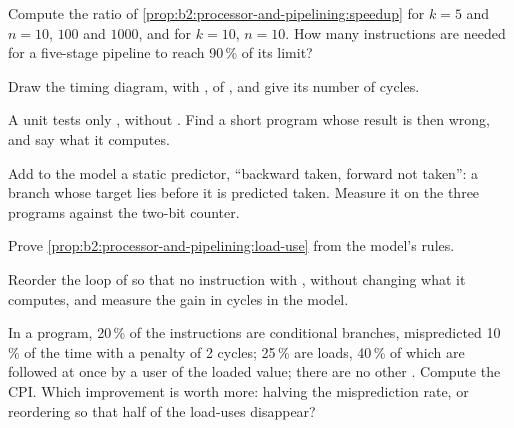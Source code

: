 \begin{exercise}[$\star$]\label{exo:b2:processor-and-pipelining:4}
Compute the ratio of \cref{prop:b2:processor-and-pipelining:speedup} for $k = 5$ and $n = 10$, $100$ and
$1000$, and for $k = 10$, $n = 10$. How many instructions are needed for a five-stage pipeline to reach 90\,\% of
its limit?
\end{exercise}

\begin{exercise}[$\star\star$]\label{exo:b2:processor-and-pipelining:5}
Draw the timing diagram, with , of , and give its number of cycles.
\end{exercise}

\begin{exercise}[$\star\star$]\label{exo:b2:processor-and-pipelining:6}
A  unit tests only , without . Find a short program whose result
is then wrong, and say what it computes.
\end{exercise}

\begin{exercise}[$\star\star$]\label{exo:b2:processor-and-pipelining:7}
Add to the model a static predictor, ``backward taken, forward not taken'': a branch whose target lies before it is
predicted taken. Measure it on the three programs against the two-bit counter.
\end{exercise}

\begin{exercise}[$\star\star$]\label{exo:b2:processor-and-pipelining:8}
Prove \cref{prop:b2:processor-and-pipelining:load-use} from the model's rules.
\end{exercise}

\begin{exercise}[$\star\star$]\label{exo:b2:processor-and-pipelining:9}
Reorder the loop of  so that no instruction  with , without changing what it
computes, and measure the gain in cycles in the model.
\end{exercise}

\begin{exercise}[$\star\star\star$]\label{exo:b2:processor-and-pipelining:10}
In a program, 20\,\% of the instructions are conditional branches, mispredicted 10\,\% of the time with a penalty of 2
cycles; 25\,\% are loads, 40\,\% of which are followed at once by a user of the loaded value; there are no other
. Compute the CPI. Which improvement is worth more: halving the misprediction rate, or reordering so that half
of the load-uses disappear?
\end{exercise}

